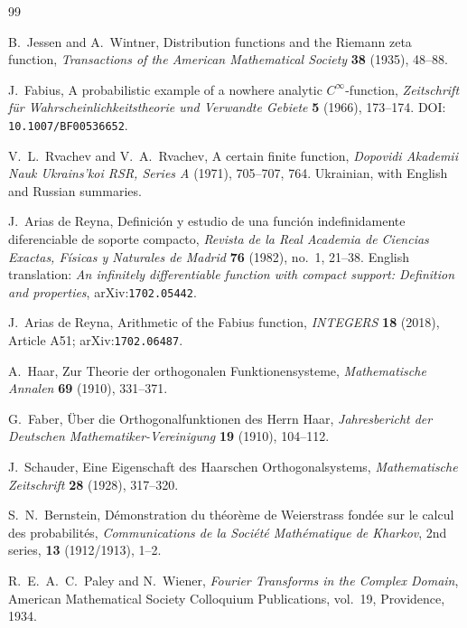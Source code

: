 \documentclass[11pt,oneside]{article}
\theoremstyle{definition}
\theoremstyle{remark}
\newcommand{\1}{\mathbf 1}
\begin{document}
\begin{thebibliography}{99}

B.~Jessen and A.~Wintner,
\newblock Distribution functions and the Riemann zeta function,
\newblock \emph{Transactions of the American Mathematical Society}
  \textbf{38} (1935), 48--88.

J.~Fabius,
\newblock A probabilistic example of a nowhere analytic $C^\infty$-function,
\newblock \emph{Zeitschrift für Wahrscheinlichkeitstheorie und Verwandte Gebiete}
  \textbf{5} (1966), 173--174.
\newblock DOI: \nolinkurl{10.1007/BF00536652}.

V.~L.~Rvachev and V.~A.~Rvachev,
\newblock A certain finite function,
\newblock \emph{Dopovidi Akademii Nauk Ukrains'koi RSR, Series A}
  (1971), 705--707, 764.  Ukrainian, with English and Russian summaries.

J.~Arias de Reyna,
\newblock Definición y estudio de una función indefinidamente diferenciable de
  soporte compacto,
\newblock \emph{Revista de la Real Academia de Ciencias Exactas, Físicas y
  Naturales de Madrid} \textbf{76} (1982), no.~1, 21--38.
\newblock English translation: \emph{An infinitely differentiable function
  with compact support: Definition and properties}, arXiv:\nolinkurl{1702.05442}.

J.~Arias de Reyna,
\newblock Arithmetic of the Fabius function,
\newblock \emph{INTEGERS} \textbf{18} (2018), Article A51;
  arXiv:\nolinkurl{1702.06487}.

A.~Haar,
\newblock Zur Theorie der orthogonalen Funktionensysteme,
\newblock \emph{Mathematische Annalen} \textbf{69} (1910), 331--371.

G.~Faber,
\newblock Über die Orthogonalfunktionen des Herrn Haar,
\newblock \emph{Jahresbericht der Deutschen Mathematiker-Vereinigung}
  \textbf{19} (1910), 104--112.

J.~Schauder,
\newblock Eine Eigenschaft des Haarschen Orthogonalsystems,
\newblock \emph{Mathematische Zeitschrift} \textbf{28} (1928), 317--320.

S.~N.~Bernstein,
\newblock Démonstration du théorème de Weierstrass fondée sur le calcul des
  probabilités,
\newblock \emph{Communications de la Société Mathématique de Kharkov},
  2nd series, \textbf{13} (1912/1913), 1--2.

R.~E.~A.~C.~Paley and N.~Wiener,
\newblock \emph{Fourier Transforms in the Complex Domain},
\newblock American Mathematical Society Colloquium Publications, vol.~19,
  Providence, 1934.


\end{thebibliography}
\end{document}
